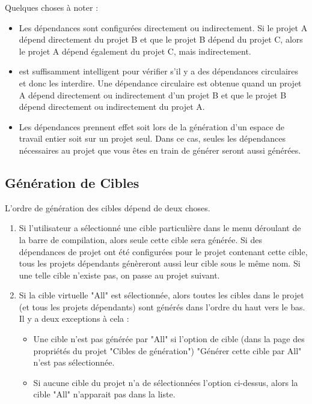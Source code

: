Quelques choses à noter :

\begin{itemize}
\item Les dépendances sont configurées directement ou indirectement. Si le projet A dépend directement du projet B et que le projet B dépend du projet C, alors le projet A dépend également du projet C, mais indirectement.
\item \codeblocks est suffisamment intelligent pour vérifier s'il y a des dépendances circulaires et donc les interdire. Une dépendance circulaire est obtenue quand un projet A dépend directement ou indirectement d'un projet B et que le projet B dépend directement ou indirectement du projet A.
\item Les dépendances prennent effet soit lors de la génération d'un espace de travail entier soit sur un projet seul. Dans ce cas, seules les dépendances nécessaires au projet que vous êtes en train de générer seront aussi générées.
\end{itemize}

\subsection{Génération de Cibles}

L'ordre de génération des cibles dépend de deux choses.

\begin{enumerate}
\item Si l'utilisateur a sélectionné une cible particulière dans le menu déroulant de la barre de compilation, alors seule cette cible sera générée. Si des dépendances de projet ont été configurées pour le projet contenant cette cible, tous les projets dépendants génèreront aussi leur cible sous le même nom. Si une telle cible n'existe pas, on passe au projet suivant.
\item Si la cible virtuelle "All" est sélectionnée, alors toutes les cibles dans le projet (et tous les projets dépendants) sont générés dans l'ordre du haut vers le bas. Il y a deux exceptions à cela :
    \begin{itemize}
    \item Une cible n'est pas générée par "All" si l'option de cible (dans la page des propriétés du projet "Cibles de génération") "Générer cette cible par All" n'est pas sélectionnée.
    \item Si aucune cible du projet n'a de sélectionnées l'option ci-dessus, alors la cible "All" n'apparait pas dans la liste.
    \end{itemize}
\end{enumerate}

